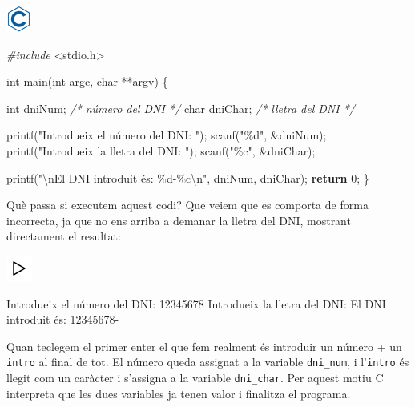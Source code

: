 \documentclass[]{book}
\newenvironment{Shaded}{\begin{snugshade}}{\end{snugshade}}
\newcommand{\CommentTok}[1]{\textcolor[rgb]{0.56,0.35,0.01}{\textit{#1}}}
\newcommand{\ControlFlowTok}[1]{\textcolor[rgb]{0.13,0.29,0.53}{\textbf{#1}}}
\newcommand{\DataTypeTok}[1]{\textcolor[rgb]{0.13,0.29,0.53}{#1}}
\newcommand{\DecValTok}[1]{\textcolor[rgb]{0.00,0.00,0.81}{#1}}
\newcommand{\ImportTok}[1]{#1}
\newcommand{\NormalTok}[1]{#1}
\newcommand{\PreprocessorTok}[1]{\textcolor[rgb]{0.56,0.35,0.01}{\textit{#1}}}
\newcommand{\SpecialCharTok}[1]{\textcolor[rgb]{0.00,0.00,0.00}{#1}}
\newcommand{\StringTok}[1]{\textcolor[rgb]{0.31,0.60,0.02}{#1}}
\begin{document}
\includegraphics{./img/c.png}

\begin{Shaded}
\begin{Highlighting}[]
\PreprocessorTok{\#include }\ImportTok{\textless{}stdio.h\textgreater{}}

\DataTypeTok{int}\NormalTok{ main(}\DataTypeTok{int}\NormalTok{ argc, }\DataTypeTok{char}\NormalTok{ **argv) \{}

    \DataTypeTok{int}\NormalTok{ dniNum;    }\CommentTok{/* número del DNI */}
    \DataTypeTok{char}\NormalTok{ dniChar;  }\CommentTok{/* lletra del DNI */}

\NormalTok{    printf(}\StringTok{"Introdueix el número del DNI: "}\NormalTok{);}
\NormalTok{    scanf(}\StringTok{"\%d"}\NormalTok{, \&dniNum);}
\NormalTok{    printf(}\StringTok{"Introdueix la lletra del DNI: "}\NormalTok{);}
\NormalTok{    scanf(}\StringTok{"\%c"}\NormalTok{, \&dniChar);}

\NormalTok{    printf(}\StringTok{"}\SpecialCharTok{\textbackslash{}n}\StringTok{El DNI introduit és: \%d{-}\%c}\SpecialCharTok{\textbackslash{}n}\StringTok{"}\NormalTok{, dniNum, dniChar);}
    \ControlFlowTok{return} \DecValTok{0}\NormalTok{;}
\NormalTok{\}}
\end{Highlighting}
\end{Shaded}

Què passa si executem aquest codi? Que veiem que es comporta de forma incorrecta, ja que no ens arriba a demanar la lletra del DNI, mostrant directament el resultat:

\includegraphics{./img/play.png}

\begin{Shaded}
\begin{Highlighting}[]
\NormalTok{Introdueix el número del DNI: }\DecValTok{12345678}
\NormalTok{Introdueix la lletra del DNI:}
\NormalTok{El DNI introduit és: }\DecValTok{12345678}\NormalTok{{-}}
\end{Highlighting}
\end{Shaded}

Quan teclegem el primer enter el que fem realment és introduir un número + un \texttt{intro} al final de tot. El número queda assignat a la variable \texttt{dni\_num}, i l'\texttt{intro} és llegit com un caràcter i s'assigna a la variable \texttt{dni\_char}. Per aquest motiu C interpreta que les dues variables ja tenen valor i finalitza el programa.
\end{document}
